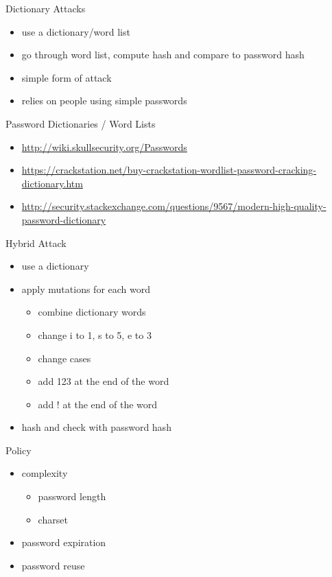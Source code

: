 \documentclass{curs}
\begin{document}
\begin{frame}{Dictionary Attacks}
  \begin{itemize}
    \item use a dictionary/word list
    \item go through word list, compute hash and compare to password hash
    \item simple form of attack
    \item relies on people using simple passwords
  \end{itemize}
\end{frame}

\begin{frame}{Password Dictionaries / Word Lists}
  \begin{itemize}
    \item \url{http://wiki.skullsecurity.org/Passwords}
    \item \url{https://crackstation.net/buy-crackstation-wordlist-password-cracking-dictionary.htm}
    \item \url{http://security.stackexchange.com/questions/9567/modern-high-quality-password-dictionary}
  \end{itemize}
\end{frame}

\begin{frame}{Hybrid Attack}
  \begin{itemize}
    \item use a dictionary
    \item apply mutations for each word
      \begin{itemize}
       \item combine dictionary words
        \item change i to 1, s to 5, e to 3
        \item change cases
        \item add 123 at the end of the word
        \item add ! at the end of the word
      \end{itemize}
    \item hash and check with password hash
  \end{itemize}
\end{frame}

\begin{frame}{Policy}
  \begin{itemize}
    \item complexity
      \begin{itemize}
        \item password length
        \item charset
      \end{itemize}
    \item password expiration
    \item password reuse
  \end{itemize}
\end{frame}
\end{document}
